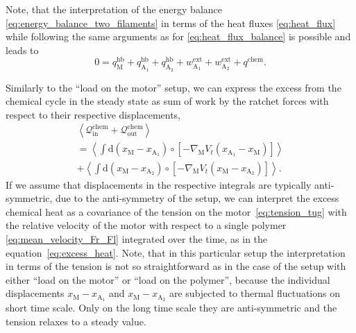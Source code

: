 \documentclass[aps,pre,twocolumn,showpacs,showkeys,superscriptaddress,floatfix]{revtex4-1}
\newcommand{\rmd}{{\mathrm d}}
\begin{document}
Note, that the interpretation of the energy balance \eqref{eq:energy_balance_two_filaments} in terms of the heat fluxes \eqref{eq:heat_flux}
while following the same arguments as for \eqref{eq:heat_flux_balance} is possible and leads to   
\[
0 = q_\text{M}^\text{hb} + q_{\text{A}_1}^\text{hb} + q_{\text{A}_2}^\text{hb} + w^\text{ext}_{\text{A}_1} + w^\text{ext}_{\text{A}_2} + q^\text{chem} .
\]

Similarly to the ``load on the motor'' setup, we can express the excess from the chemical cycle in the steady state as sum of work by the ratchet forces with respect to their respective displacements,
\begin{multline}
\left\langle 
{\mathcal Q}_\text{in}^\text{chem} + {\mathcal Q}_\text{out}^\text{chem} 
\right\rangle 
\\
= 
\left\langle 
\int \rmd \left( x_\text{M} - x_{\text{A}_1} \right) \circ \left[ - \nabla_\text{M} V_t( x_{\text{A}_1} - x_\text{M} ) \right]
\right\rangle 
\\
+
\left\langle 
\int \rmd \left( x_\text{M} - x_{\text{A}_2} \right) \circ \left[ - \nabla_\text{M} V_t( x_\text{M} - x_{\text{A}_2} ) \right]
\right\rangle .
\label{eq:excess_heat_tug}
\end{multline} 
If we assume that displacements in the respective integrals are typically anti-symmetric, due to the anti-symmetry of the setup, 
we can interpret the excess chemical heat as a covariance of the tension on the motor~\eqref{eq:tension_tug} with the relative velocity of the motor with respect to a single polymer \eqref{eq:mean_velocity_Fr_Fl} integrated over the time, 
as in the equation~\eqref{eq:excess_heat}. 
Note, that in this particular setup the interpretation in terms of the tension is not so straightforward as in the case of the setup with either ``load on the motor'' or ``load on the polymer'', 
because the individual displacements $x_\text{M} - x_{\text{A}_1}$ and $x_\text{M} - x_{\text{A}_2}$ are subjected to thermal fluctuations on short time scale. 
Only on the long time scale they are anti-symmetric and the tension relaxes to a steady value.  
\end{document}
